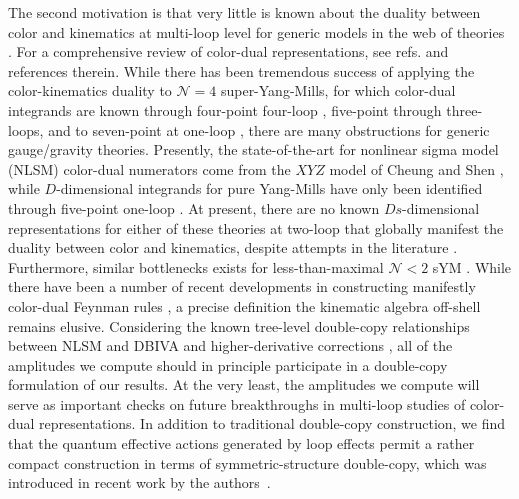 \documentclass[11pt,letter]{article}
\begin{document}
The second motivation is that very little is known about the duality between color and kinematics at multi-loop level for generic models in the web of theories \cite{BCJreview}. For a comprehensive review of color-dual representations, see refs. \cite{BCJreview, Bern:2022wqg, Adamo:2022dcm} and references therein. While there has been tremendous success of applying the color-kinematics duality to $\mathcal{N}=4$ super-Yang-Mills, for which color-dual integrands are known through four-point four-loop \cite{Bern:2012uf, Neq44np, GravityFour}, five-point through three-loops, and to seven-point at one-loop \cite{Bjerrum-Bohr:2013iza,Edison:2020uzf,Edison:2022jln}, there are many obstructions for generic gauge/gravity theories. Presently, the state-of-the-art for nonlinear sigma model (NLSM) color-dual numerators come from the $XY\!Z$ model of Cheung and Shen \cite{Cheung2016prv}, while $D$-dimensional integrands for pure Yang-Mills have only been identified through five-point one-loop \cite{He:2017spx}. At present, there are no known $Ds$-dimensional representations for either of these theories at two-loop that globally manifest the duality between color and kinematics, despite attempts in the literature \cite{OneTwoLoopPureYMBCJ, Mogull:2015adi, Bern:2015ooa, Geyer:2019hnn}. Furthermore, similar bottlenecks exists for less-than-maximal $\mathcal{N}<2$ sYM \cite{Johansson:2017bfl}. While there have been a number of recent developments in constructing manifestly color-dual Feynman rules \cite{Chen:2019ywi,Chen:2021chy,Brandhuber:2021bsf,Cheung:2021zvb,Ben-Shahar:2021zww,Cheung:2022mix, Ben-Shahar:2022ixa}, a precise definition the kinematic algebra off-shell remains elusive. Considering the known tree-level double-copy relationships between NLSM and DBIVA and higher-derivative corrections \cite{Cachazo:2014xea,Carrasco:2016ldy}, all of the amplitudes we compute should in principle participate in a double-copy formulation of our results. At the very least, the amplitudes we compute will serve as important checks on future breakthroughs in multi-loop studies of color-dual representations. In addition to traditional double-copy construction, we find that the quantum effective actions generated by loop effects permit a rather compact construction in terms of {symmetric-structure double-copy}, which was introduced in recent work by the authors~\cite{Carrasco:2022jxn}. 
\end{document}
